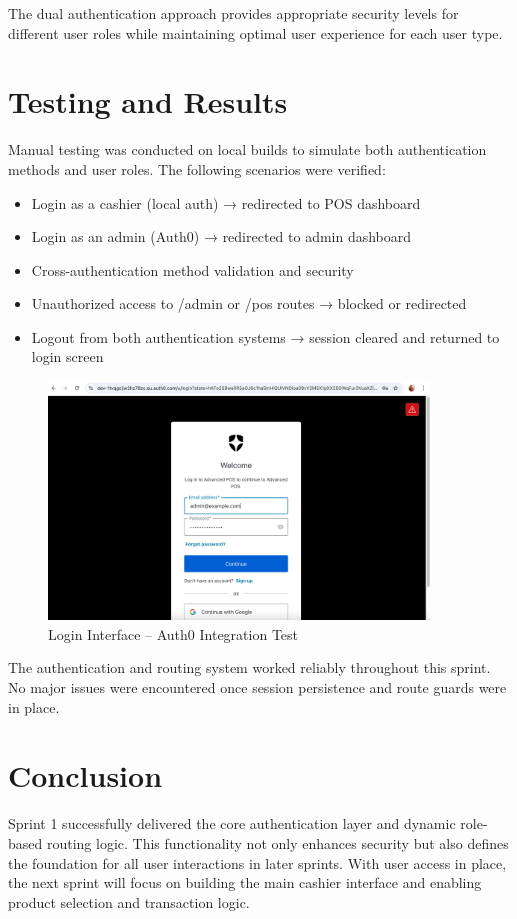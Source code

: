 The dual authentication approach provides appropriate security levels for different user roles while maintaining optimal user experience for each user type.

\section{Testing and Results}

Manual testing was conducted on local builds to simulate both authentication methods and user roles. The following scenarios were verified:

\begin{itemize}
  \item Login as a cashier (local auth) → redirected to POS dashboard
  \item Login as an admin (Auth0) → redirected to admin dashboard
  \item Cross-authentication method validation and security
  \item Unauthorized access to /admin or /pos routes → blocked or redirected
  \item Logout from both authentication systems → session cleared and returned to login screen
\end{itemize}

\begin{figure}[H]
  \centering
  \includegraphics[width=0.9\textwidth]{working app screenshots/loginauth0.png}
  \caption{Login Interface – Auth0 Integration Test}
  \label{fig:sprint1-login}
\end{figure}

The authentication and routing system worked reliably throughout this sprint. No major issues were encountered once session persistence and route guards were in place.

\section{Conclusion}

Sprint 1 successfully delivered the core authentication layer and dynamic role-based routing logic. This functionality not only enhances security but also defines the foundation for all user interactions in later sprints. With user access in place, the next sprint will focus on building the main cashier interface and enabling product selection and transaction logic.
